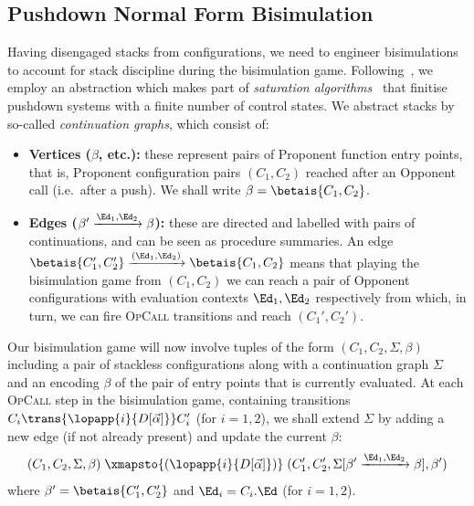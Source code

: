\subsection{Pushdown Normal Form Bisimulation}\label{sec:pdnf-bisim}
Having disengaged stacks from configurations, we need to engineer bisimulations to account for stack discipline during the bisimulation game. 
  Following~\cite{P4F}, we employ an abstraction  which
makes part of \emph{saturation algorithms}~\cite{BouajjaniEM97,FinkelWW97} that finitise pushdown systems with a finite number of control states. We abstract  stacks by so-called \emph{continuation graphs}, which consist of:
\begin{itemize}
  \item \textbf{Vertices ($\beta$, etc.):} these represent pairs of Proponent function entry points, that is, {Proponent} configuration pairs $(C_1,C_2)$ reached after an Opponent call (i.e.\ after a push). We shall write $\beta=\betais{C_1,C_2}$.
\item \textbf{Edges ($\beta'\xrightarrow{\Ed_1,\Ed_2}\beta$):} these are directed and labelled with pairs of continuations, and can be seen as procedure summaries.
  An edge $\betais{C_1',C_2'}\xrightarrow{(\Ed_1,\Ed_2)}\betais{C_1,C_2}$ means that playing the bisimulation game from $(C_1,C_2)$ we can reach a pair of Opponent configurations with evaluation contexts $\Ed_1,\Ed_2$ respectively from which, in turn, we can fire \textsc{OpCall} transitions and reach $(C_1',C_2')$.
\end{itemize}
Our bisimulation game  will now involve tuples of the form $(C_1,C_2,\Sigma,\beta)$ including a pair of stackless configurations along with a continuation graph $\Sigma$ and an encoding $\beta$ of the pair of entry points that is currently evaluated. 
At each \textsc{OpCall} step in the bisimulation game,
containing transitions $C_i\trans{\lopapp{i}{D[\vec\alpha]}}C_i'$ (for $i=1,2$),  
we shall extend $\Sigma$ by adding a new edge (if not already present) and update the current $\beta$:
\[
(C_1,C_2,\Sigma,\beta)\;  \xmapsto{(\lopapp{i}{D[\vec\alpha]})}\; (C_1',C_2',\Sigma[\beta'\xrightarrow{\Ed_1,\Ed_2}\beta],\beta')
\]
where $\beta'=\betais{C_1',C_2'}$ and $\Ed_i=C_i.\Ed$ (for $i=1,2$).

